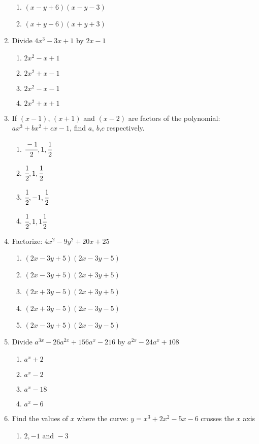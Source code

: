 \begin{multicols}{2}
\begin{enumerate}[label={\arabic*.}]
\begin{enumerate}[label={\Alph*.}]
	\item \((x-y+6)(x-y-3)\)
	\item \((x+y-6)(x+y+3)\)
	\end{enumerate}
\item Divide $4x^3 - 3x + 1$ by $2x -1$
	\begin{enumerate}[label={\Alph*.}]
	\item \(2x^2 -x + 1\)
	\item \(2x^2 + x -1\)
	\item \(2x^2-x-1\)
	\item \(2x^2 +x + 1\)
	\end{enumerate}
\item If \((x-1)\), \((x+1)\) and \((x-2)\) are factors of the polynomial: $ax^3 + bx^2 +cx -1$, find \(a\), \(b\),\(c\) respectively. 
	\begin{enumerate}[label={\Alph*.}]
	\item \(\cfrac{-1}{2},1, \cfrac{1}{2}\)
	\item \(\cfrac{1}{2}, 1, \cfrac{1}{2}\)
	\item \(\cfrac{1}{2}, -1, \cfrac{1}{2}\)
	\item \(\cfrac{1}{2}, 1, 1\cfrac{1}{2}\)
	\end{enumerate}
\item Factorize: $4x^2 - 9y^2 + 20x + 25 $
	\begin{enumerate}[label={\Alph*.}]
	\item \((2x - 3y + 5)(2x - 3y - 5)\)
	\item \((2x - 3y + 5)(2x + 3y + 5)\)
	\item \((2x + 3y - 5)(2x + 3y + 5)\)
	\item \((2x + 3y - 5)(2x - 3y - 5)\)
	\item \((2x - 3y + 5)(2x - 3y - 5)\)
	\end{enumerate}
\item Divide $a^{3x} - 26a^{2x} + 156a^x - 216 $ by $a^{2x} - 24a^x + 108$
	\begin{enumerate}[label={\Alph*.}]
	\item \( a^x + 2\)
	\item \(a^x - 2\)
	\item \(a^x -18\)
	\item \(a^x -6\)
	\end{enumerate}
\item Find the values of \(x\) where the curve: \(y = x^3 + 2x^2 - 5x - 6\) crosses the $x$ axis
	\begin{enumerate}[label={\Alph*.}]
	\item \(2, -1 \text{ and } -3\)

\end{enumerate}
\end{enumerate}
\end{multicols}
